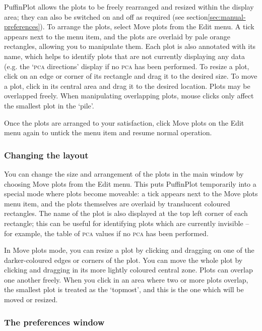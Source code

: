\documentclass[a4paper]{article}
\newcommand{\ppcmd}[1]{\textsf{#1}} %
\newcommand{\caps}[1]{\textsc{#1}} %
\begin{document}
PuffinPlot allows the plots to be freely rearranged and resized within the
display area; they can also be switched on and off as required (see
section\ref{sec:manual-preferences}). To arrange the plots, select
\ppcmd{Move plots} from the \ppcmd{Edit} menu. A tick appears next to the
menu item, and the plots are overlaid by pale orange rectangles, allowing you
to manipulate them. Each plot is also annotated with its name, which helps to
identify plots that are not currently displaying any data (e.g. the
`\caps{pca} directions' display if no \caps{pca} has been performed. To
resize a plot, click on an edge or corner of its rectangle and drag it to the
desired size. To move a plot, click in its central area and drag it to the
desired location. Plots may be overlapped freely. When manipulating
overlapping plots, mouse clicks only affect the smallest plot in the `pile'.

Once the plots are arranged to your satisfaction, click \ppcmd{Move plots} on
the \ppcmd{Edit} menu again to untick the menu item and resume normal
operation.

\subsubsection{\label{sec:manual-change-layout}Changing the layout}

You can change the size and arrangement of the plots in the main window by
choosing \ppcmd{Move plots} from the \ppcmd{Edit} menu. This puts PuffinPlot
temporarily into a special mode where plots become moveable: a tick appears
next to the \ppcmd{Move plots} menu item, and the plots themselves are
overlaid by translucent coloured rectangles. The name of the plot is also
displayed at the top left corner of each rectangle; this can be useful for
identifying plots which are currently invisible -- for example, the table of
\caps{pca} values if no \caps{pca} has been performed.

In \ppcmd{Move plots} mode, you can resize a plot by clicking and dragging on
one of the darker-coloured edges or corners of the plot. You can move the
whole plot by clicking and dragging in its more lightly coloured central
zone. Plots can overlap one another freely. When you click in an area where
two or more plots overlap, the smallest plot is treated as the `topmost', and
this is the one which will be moved or resized.

\subsubsection[sec:manual-preferences]{The preferences window}
\end{document}
